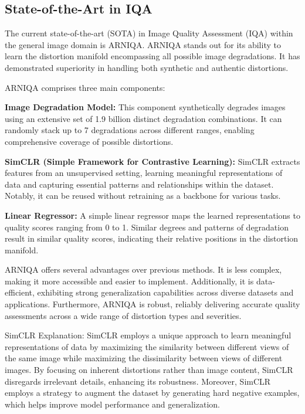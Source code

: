 \subsection{State-of-the-Art in IQA}
\label{sub:SOTA_IQA}
The current state-of-the-art (SOTA) in Image Quality Assessment (IQA) within the general image domain is ARNIQA. ARNIQA stands out for its ability to learn the distortion manifold encompassing all possible image degradations. It has demonstrated superiority in handling both synthetic and authentic distortions. \par
\vspace{\baselineskip}
ARNIQA comprises three main components:

\textbf{Image Degradation Model:} This component synthetically degrades images using an extensive set of 1.9 billion distinct degradation combinations. It can randomly stack up to 7 degradations across different ranges, enabling comprehensive coverage of possible distortions. \par
\textbf{SimCLR (Simple Framework for Contrastive Learning):} SimCLR extracts features from an unsupervised setting, learning meaningful representations of data and capturing essential patterns and relationships within the dataset. Notably, it can be reused without retraining as a backbone for various tasks. \par
\textbf{Linear Regressor:} A simple linear regressor maps the learned representations to quality scores ranging from 0 to 1. Similar degrees and patterns of degradation result in similar quality scores, indicating their relative positions in the distortion manifold. \par
\vspace{\baselineskip}
ARNIQA offers several advantages over previous methods. It is less complex, making it more accessible and easier to implement. Additionally, it is data-efficient, exhibiting strong generalization capabilities across diverse datasets and applications. Furthermore, ARNIQA is robust, reliably delivering accurate quality assessments across a wide range of distortion types and severities. \par
\vspace{\baselineskip}
SimCLR Explanation: SimCLR employs a unique approach to learn meaningful representations of data by maximizing the similarity between different views of the same image while maximizing the dissimilarity between views of different images. By focusing on inherent distortions rather than image content, SimCLR disregards irrelevant details, enhancing its robustness. Moreover, SimCLR employs a strategy to augment the dataset by generating hard negative examples, which helps improve model performance and generalization. \par

